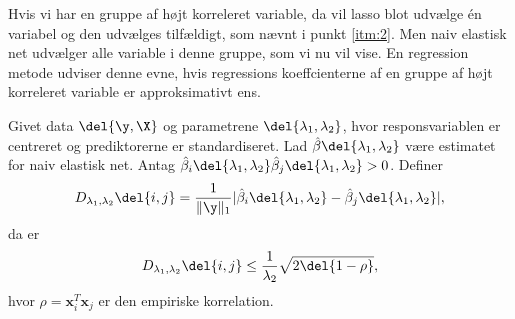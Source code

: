 %
Hvis vi har en gruppe af højt korreleret variable, da vil lasso blot udvælge én variabel og den udvælges tilfældigt, som nævnt i punkt \ref{itm:2}.
Men naiv elastisk net udvælger alle variable i denne gruppe, som vi nu vil vise. 
En regression metode udviser denne evne, hvis regressions koeffcienterne af en gruppe af højt korreleret variable er approksimativt ens.

\begin{thm} \label{thm:elastisk_net}
Givet data \(\del{\y, \X}\) og parametrene \(\del{\lambda_1, \lambda_2}\), hvor responsvariablen er centreret og prediktorerne er standardiseret.
Lad \(\hat{\beta} \del{\lambda_1, \lambda_2}\) være estimatet for naiv elastisk net.
Antag \(\hat{\beta}_i \del{\lambda_1, \lambda_2} \hat{\beta}_j \del{\lambda_1, \lambda_2} > 0\).
Definer
\begin{align*}
D_{\lambda_1, \lambda_2} \del{i,j} = \frac{1}{\Vert \y \Vert_1} \vert \hat{\beta}_i \del{\lambda_1, \lambda_2} - \hat{\beta}_j \del{\lambda_1, \lambda_2} \vert,
\end{align*}
da er
\begin{align}
D_{\lambda_1, \lambda_2} \del{i,j} \leq \frac{1}{\lambda_2} \sqrt{2 \del{1-\rho}}, \label{eq:EN5}
\end{align}
hvor \(\rho = \mathbf{x}_i^T \mathbf{x}_j\) er den empiriske korrelation.
\end{thm}
